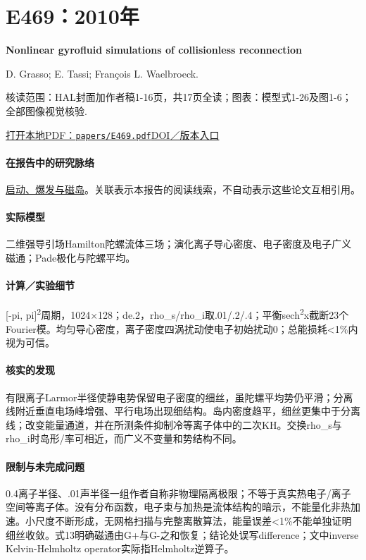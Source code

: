 \section{E469：2010年}\label{paper:E469}

\textbf{Nonlinear gyrofluid simulations of collisionless reconnection}\citep{E469}\

D. Grasso;  E. Tassi;  François L. Waelbroeck.

\textsf{核读范围：}HAL封面加作者稿1-16页，共17页全读；\textsf{图表：}模型式1-26及图1-6；全部图像视觉核验.

\href{run:papers/E469.pdf}{打开本地PDF：\texttt{papers/E469.pdf}}\quad\href{https://doi.org/10.1063/1.3475440}{DOI／版本入口}

\paragraph{在报告中的研究脉络}\hyperref[story:onset]{启动、爆发与磁岛}。关联表示本报告的阅读线索，不自动表示这些论文互相引用。

\paragraph{实际模型}二维强导引场Hamilton陀螺流体三场；演化离子导心密度、电子密度及电子广义磁通；Pade极化与陀螺平均。

\paragraph{计算／实验细节}[-pi, pi]\textsuperscript{2}周期，1024×128；de.2，rho\_s/rho\_i取.01/.2/.4；平衡sech\textsuperscript{2}x截断23个Fourier模。均匀导心密度，离子密度四涡扰动使电子初始扰动0；总能损耗<1\%内视为可信。

\paragraph{核实的发现}有限离子Larmor半径使静电势保留电子密度的细丝，虽陀螺平均势仍平滑；分离线附近垂直电场峰增强、平行电场出现细结构。岛内密度趋平，细丝更集中于分离线；改变能量通道，并在所测条件抑制冷等离子体中的二次KH。交换rho\_s与rho\_i时岛形/率可相近，而广义不变量和势结构不同。

\paragraph{限制与未完成问题}0.4离子半径、.01声半径一组作者自称非物理隔离极限；不等于真实热电子/离子空间等离子体。没有分布函数，电子束与加热是流体结构的暗示，不能量化非热加速。小尺度不断形成，无网格扫描与完整离散算法，能量误差<1\%不能单独证明细丝收敛。式13明确磁通由G+与G-之和恢复；结论处误写difference；文中inverse Kelvin-Helmholtz operator实际指Helmholtz逆算子。

